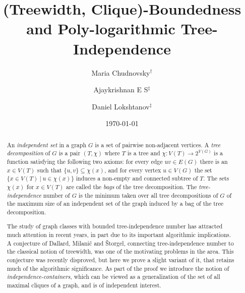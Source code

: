 \documentclass[11pt]{amsart}
\title{(Treewidth, Clique)-Boundedness and Poly-logarithmic Tree-Independence}
\author{Maria Chudnovsky$^{\dagger}$}
\author{Ajaykrishnan E S$^{\ddagger}$}
\author{Daniel Lokshtanov$^{\ddagger}$}
\date{\today}
\newcommand{\atw}{tw_{\alpha}\xspace}
\begin{document}

\begin{abstract}
An {\em independent set} in a graph $G$ is a set of pairwise non-adjacent vertices.
A {\em tree decomposition} of  $G$ is a pair $(T, \chi)$ where $T$ is a tree and $\chi : V(T) \rightarrow 2^{V(G)}$ is a function satisfying the following two axioms: for every edge $uv \in E(G)$ there is an $x \in V(T)$ such that $\{u,v\} \subseteq \chi(x)$, and for every vertex $u \in V(G)$ the set $\{x \in V(T) ~|~ u \in \chi(x)\}$ induces a non-empty and connected subtree of $T$.
%
The sets $\chi(x)$ for $x \in V(T)$ are called the {\em bags} of the tree decomposition.  The {\em tree-independence} number of $G$ is the minimum taken over all tree decompositions of $G$ of the maximum size of an independent set of the graph induced by a bag of the tree decomposition. 


The study of graph classes with bounded  tree-independence number has attracted much attention in recent years, in part due to its important algorithmic implications. A conjecture
of Dallard, Milani\v{c} and \v{S}torgel, connecting tree-independence number to the classical notion of treewidth, was one of the motivating problems in the area.
This conjecture was recently disproved, but here we prove a slight variant of
it, that retains much of the algorithmic significance. As part of the proof we introduce the notion of {\em independence-containers}, which can be viewed as a generalization of the set of all maximal cliques of a graph, and is of independent interest. 
\end{abstract}

\end{document}
